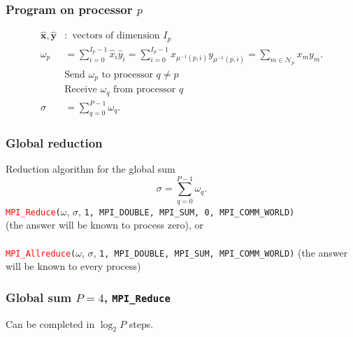 \begin{frame}
  \frametitle{Program on processor $p$}
  \begin{align*}
    \hat{\bm x}, \hat{\bm y} &: \text{ vectors of dimension } I_p \\
    \omega_p &= \sum_{i=0}^{I_p-1} \hat{x}_i \hat{y}_i
    = \sum_{i=0}^{I_p-1} x_{\mu^{-1}(p,i)} y_{\mu^{-1}(p,i)}
    = \sum_{m \in \mathcal{N}_p} x_m y_m. \\
                 & \text{Send } \omega_p  \text{ to processor } q \not= p \\
                 & \text{Receive } \omega_q  \text{ from processor } q \\
    \sigma &= \sum_{q=0}^{P-1} \omega_q.
  \end{align*}
\end{frame}

\begin{frame}
  \frametitle{Global reduction}
  Reduction algorithm for the global sum
  \[
    \sigma = \sum_{q=0}^{P-1} \omega_q.
  \]
  \texttt{\textcolor{red}{MPI\_Reduce}(}$\omega$, $\sigma$,
  \texttt{1, MPI\_DOUBLE, MPI\_SUM, 0, MPI\_COMM\_WORLD)} \\
  (the answer will be known to process zero), or \\~\\
  \texttt{\textcolor{red}{MPI\_Allreduce}(}$\omega$, $\sigma$,
  \texttt{1, MPI\_DOUBLE, MPI\_SUM, MPI\_COMM\_WORLD)}
  (the answer will be known to every process)
\end{frame}

\begin{frame}
  \frametitle{Global sum $P=4$, \texttt{MPI\_Reduce}}
  \begin{center}
  \end{center}
  Can be completed in $\log_2 P$ steps.
\end{frame}

